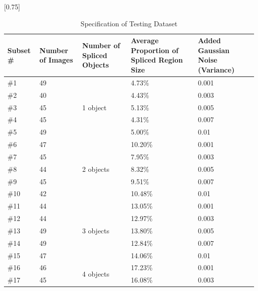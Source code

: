 \documentclass[a4paper, 12pt, twoside]{report}
\begin{document}
\begin{table}[htbp]
\renewcommand\arraystretch{0.65}
	\centering
	\caption{Specification of Testing Dataset}
	\scalebox{0.8}[0.75]{\begin{tabular}{m{}<{\centering}m{}<{\centering}m{}<{\centering}m{}<{\centering}m{}<{\centering}}
		\hline
		Subset \# & Number of Images & Number of Spliced Objects & Average Proportion of Spliced Region Size & Added Gaussian Noise (Variance) \bigstrut\\
		\hline
		\#1   & 49    & \multirow{5}[10]{*}{1 object} & 4.73\% & 0.001 \bigstrut\\
		\cline{1-2}\cline{4-5}    \#2   & 40    &       & 4.43\% & 0.003 \bigstrut\\
		\cline{1-2}\cline{4-5}    \#3   & 45    &       & 5.13\% & 0.005 \bigstrut\\
		\cline{1-2}\cline{4-5}    \#4   & 45    &       & 4.31\% & 0.007 \bigstrut\\
		\cline{1-2}\cline{4-5}    \#5   & 49    &       & 5.00\% & 0.01 \bigstrut\\
		\hline
		\#6   & 47    & \multirow{5}[10]{*}{2 objects} & 10.20\% & 0.001 \bigstrut\\
		\cline{1-2}\cline{4-5}    \#7   & 45    &       & 7.95\% & 0.003 \bigstrut\\
		\cline{1-2}\cline{4-5}    \#8   & 44    &       & 8.32\% & 0.005 \bigstrut\\
		\cline{1-2}\cline{4-5}    \#9   & 45    &       & 9.51\% & 0.007 \bigstrut\\
		\cline{1-2}\cline{4-5}    \#10  & 42    &       & 10.48\% & 0.01 \bigstrut\\
		\hline
		\#11  & 44    & \multirow{5}[10]{*}{3 objects} & 13.05\% & 0.001 \bigstrut\\
		\cline{1-2}\cline{4-5}    \#12  & 44    &       & 12.97\% & 0.003 \bigstrut\\
		\cline{1-2}\cline{4-5}    \#13  & 49    &       & 13.80\% & 0.005 \bigstrut\\
		\cline{1-2}\cline{4-5}    \#14  & 49    &       & 12.84\% & 0.007 \bigstrut\\
		\cline{1-2}\cline{4-5}    \#15  & 47    &       & 14.06\% & 0.01 \bigstrut\\
		\hline
		\#16  & 46    & \multirow{5}[10]{*}{4 objects} & 17.23\% & 0.001 \bigstrut\\
		\cline{1-2}\cline{4-5}    \#17  & 45    &       & 16.08\% & 0.003 \bigstrut\\

\end{tabular}}
\end{table}
\end{document}

